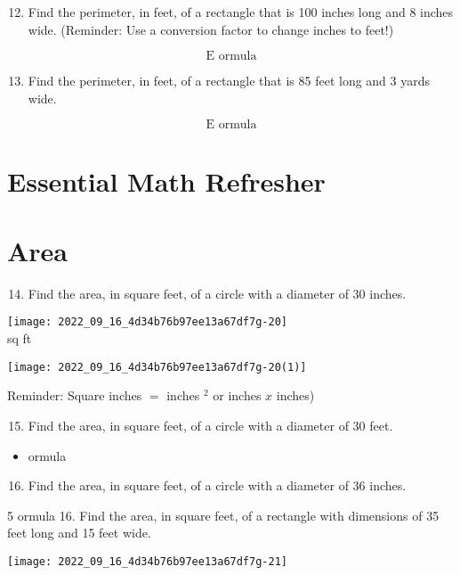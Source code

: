 \begin{enumerate}
\begin{enumerate}
  \setcounter{enumi}{11}
  \item Find the perimeter, in feet, of a rectangle that is 100 inches long and 8 inches wide. (Reminder: Use a conversion factor to change inches to feet!)
\end{enumerate}
$$
\text { E ormula }
$$

\begin{enumerate}
  \setcounter{enumi}{12}
  \item Find the perimeter, in feet, of a rectangle that is 85 feet long and 3 yards wide.
\end{enumerate}
$$
\text { E ormula }
$$

\section{Essential Math Refresher}
\section{Area}
\begin{enumerate}
  \setcounter{enumi}{13}
  \item Find the area, in square feet, of a circle with a diameter of 30 inches.
\end{enumerate}
\texttt{[image: 2022\_09\_16\_4d34b76b97ee13a67df7g-20]}\\
sq ft

\texttt{[image: 2022\_09\_16\_4d34b76b97ee13a67df7g-20(1)]}

Reminder: Square inches $=$ inches $^{2}$ or inches $x$ inches)

\begin{enumerate}
  \setcounter{enumi}{14}
  \item Find the area, in square feet, of a circle with a diameter of 30 feet.
\end{enumerate}
\begin{itemize}
  \item ormula
\end{itemize}
\begin{enumerate}
  \setcounter{enumi}{15}
  \item Find the area, in square feet, of a circle with a diameter of 36 inches.
\end{enumerate}
5 ormula 16. Find the area, in square feet, of a rectangle with dimensions of 35 feet long and 15 feet wide.

\texttt{[image: 2022\_09\_16\_4d34b76b97ee13a67df7g-21]}


\end{enumerate}
